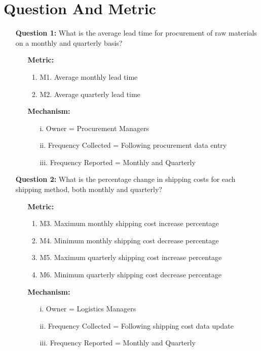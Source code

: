 \documentclass[english,12pt,a4paper]{report}
\begin{document}
	\section{Question And Metric}
	\begin{itemize}
		\item[\textbullet] \textbf{Question 1:} What is the average lead time for procurement of raw materials on a monthly and quarterly basis? 
		\begin{itemize}
			\item[] \textbf{Metric:}
			\begin{enumerate}[label={}, left=0em]
				\item M1. Average monthly lead time
				\item M2. Average quarterly lead time
			\end{enumerate}
			\item[] \textbf{Mechanism:}
			\begin{enumerate}[label={}, left=0em]
				\item[i.] Owner = Procurement Managers
				\item[ii.] Frequency Collected = Following procurement data entry
				\item[iii.] Frequency Reported = Monthly and Quarterly
			\end{enumerate}
		\end{itemize}
		
		\item[\textbullet] \textbf{Question 2:} What is the percentage change in shipping costs for each shipping method, both monthly and quarterly? 
		\begin{itemize}
			\item[] \textbf{Metric:}
			\begin{enumerate}[label={}, left=0em]
				\item M3. Maximum monthly shipping cost increase percentage
				\item M4. Minimum monthly shipping cost decrease percentage
				\item M5. Maximum quarterly shipping cost increase percentage
				\item M6. Minimum quarterly shipping cost decrease percentage
			\end{enumerate}
			\item[] \textbf{Mechanism:}
			\begin{enumerate}[label={}, left=0em]
				\item[i.] Owner = Logistics Managers
				\item[ii.] Frequency Collected = Following shipping cost data update
				\item[iii.] Frequency Reported = Monthly and Quarterly
			\end{enumerate}
		\end{itemize}
		

\end{itemize}
\end{document}
